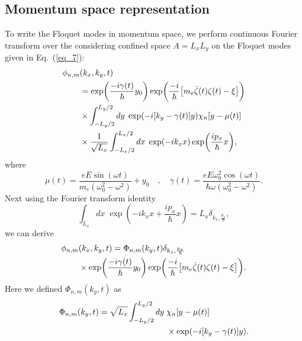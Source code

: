 \subsection{Momentum space representation}

To write the Floquet modes in momentum space, we perform continuous Fourier transform over the considering confined space $A=L_xL_y$ on the Floquet modes given in Eq.~(\ref{eq_7}):
\begin{equation} \label{eq_b8}
  \begin{aligned}
    \phi_{n,m}&(k_x,k_y,t) \\
    & =
    \exp(
     \frac{-i\gamma(t)}{\hbar}
     y_0)
    \exp(\frac{-i}{\hbar}
    \qty[
    m_e \dot{\zeta}(t) \zeta(t) - \xi
    ])\\
    & \times
    \int_{-L_y/2}^{L_y/2} dy\; \exp(-i\qty[k_y - \gamma(t)]y)
    \chi_{n}\qty[y - \mu(t)] \\
     & \times
     \frac{1}{\sqrt{L_x}}
     \int_{-L_x/2}^{L_x/2} dx\;
     \exp(-ik_x x)
     \exp( \frac{i p_x }{\hbar}x ),
  \end{aligned}
\end{equation}
where
\begin{equation} \label{eq_b9}
  \mu(t) = \frac{eE\sin(\omega t)}{m_e(\omega_0^2 - \omega^2)} + y_0
  \quad,\quad
  \gamma(t) =
  \frac{eE\omega_0^2\cos(\omega t)}{\hbar\omega(\omega_0^2 - \omega^2)}.
\end{equation}
Next using the Fourier transform identity \cite{bruus04}
\begin{equation} \label{eq_b10}
  \int_{L_x} dx\;
  \exp( -ik_x x + \frac{i p_x }{\hbar}x ) =
  L_x \delta_{k_x,\frac{p_x}{\hbar}},
\end{equation}
we can derive
\begin{equation} \label{eq_b11}
  \begin{aligned}
    \phi_{n,m}&(k_x,k_y,t)  =
    \Phi_{n,m}(k_y,t)
    \delta_{k_x,\frac{p_x}{\hbar}}\\
    & \times
    \exp(
     \frac{-i\gamma(t)}{\hbar}
     y_0)
    \exp(\frac{-i}{\hbar}
    \qty[
    m_e \dot{\zeta}(t) \zeta(t) - \xi
    ]).
  \end{aligned}
\end{equation}
Here we defined $\Phi_{n,m}(k_y,t)$ as
\begin{equation} \label{eq_b12}
  \begin{aligned}
    \Phi_{n,m}(k_y,t) =
    \sqrt{L_x}
    \int_{-L_y/2}^{L_y/2} dy\; &
    \chi_{n}\qty[y - \mu(t)] \\
    & \times
    \exp(
      -i\qty[k_y - \gamma(t)]
      y).
  \end{aligned}
\end{equation}
